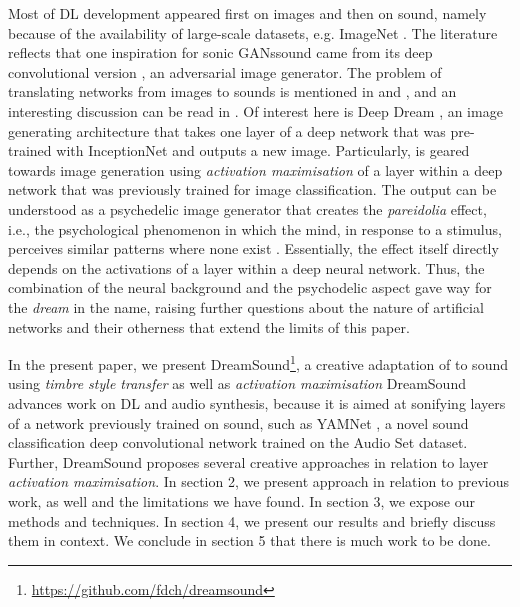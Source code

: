\documentclass[a4paper,10pt,oneside]{article}
\begin{document}
\begin{sloppy}
Most of DL development appeared first on images and then on sound, namely because of the availability of large-scale datasets, e.g. ImageNet \cite{ILSVRC15}. The literature reflects that one inspiration for sonic GANssound came from its deep convolutional version \cite{radford2015unsupervised}, an adversarial image generator. The problem of translating networks from images to sounds is mentioned in \cite{RothmanBlog} and \cite{2019Purwins}, and an interesting discussion can be read in \cite{Briot2017}. Of interest here is Deep Dream \cite{Mordvintsev2015}, an image generating architecture that takes one layer of a deep network that was pre-trained with InceptionNet \cite{szegedy2014going} and outputs a new image. Particularly, \cite{Mordvintsev2015} is geared towards image generation using \textit{activation maximisation} of a layer within a deep network that was previously trained for image classification. The output can be understood as a psychedelic image generator that creates the \textit{pareidolia} effect, i.e., the psychological phenomenon in which the mind, in response to a stimulus, perceives similar patterns where none exist \cite{Briot2017}. Essentially, the effect itself directly depends on the activations of a layer within a deep neural network. Thus, the combination of the neural background and the psychodelic aspect gave way for the \textit{dream} in the name, raising further questions about the nature of artificial networks and their otherness that extend the limits of this paper.

In the present paper, we present DreamSound\footnote{\url{https://github.com/fdch/dreamsound}}, a creative adaptation of \cite{Mordvintsev2015} to sound using \textit{timbre style transfer} as well as \textit{activation maximisation} DreamSound advances work on DL and audio synthesis, because it is aimed at sonifying layers of a network previously trained on sound, such as YAMNet \cite{YamNet2020}, a novel sound classification deep convolutional network trained on the Audio Set \cite{2017audioset} dataset. Further, DreamSound proposes several creative approaches in relation to layer \textit{activation maximisation}. 
In section 2, we present approach in relation to previous work, as well and the limitations we have found. In section 3, we expose our methods and techniques. In section 4, we present our results and briefly discuss them in context. We conclude in section 5 that there is much work to be done.


\end{sloppy}
\end{document}
